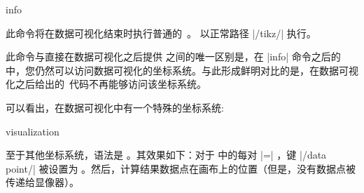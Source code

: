 \begin{datavisualizationoperation}{info}{} %

    此命令将在数据可视化结束时执行普通的\tikzname\ 。 以正常路径 |/tikz/| 执行。


    此命令与直接在数据可视化之后提供  之间的唯一区别是，在 |info| 命令之后的  中，您仍然可以访问数据可视化的坐标系统。与此形成鲜明对比的是，在数据可视化之后给出的\tikzname\ 代码不再能够访问该坐标系统。
\begin{codeexample}[preamble={\usetikzlibrary{datavisualization.formats.functions}}]
\end{codeexample}


    可以看出，在数据可视化中有一个特殊的坐标系统:

    \begin{coordinatesystem}{visualization}

        至于其他坐标系统，语法是 。其效果如下：对于  中的每对  |=| ，键 |/data point/| 被设置为 。然后，计算结果数据点在画布上的位置（但是，没有数据点被传递给显像器）。
    \end{coordinatesystem}
\end{datavisualizationoperation}

